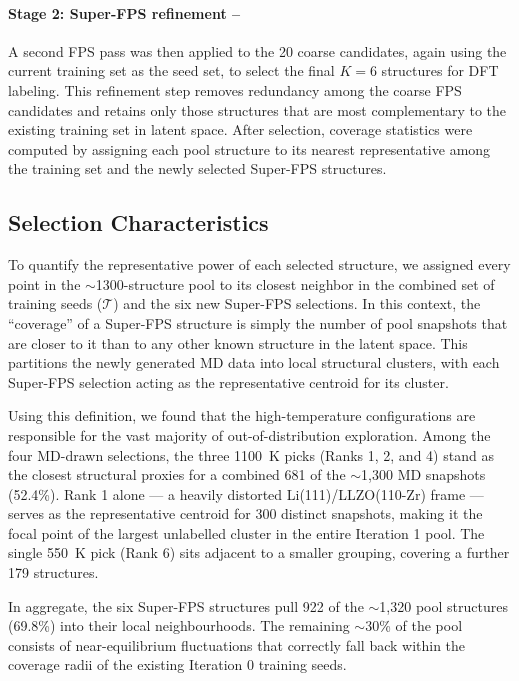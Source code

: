\documentclass[12pt,a4paper,oneside]{book}
\begin{document}
\paragraph{Stage 2: Super-FPS refinement --}
A second FPS pass was then applied to the 20 coarse candidates, again using
the current training set as the seed set, to select the final $K=6$
structures for DFT labeling. This refinement step removes redundancy among
the coarse FPS candidates and retains only those structures that are most
complementary to the existing training set in latent space. After selection,
coverage statistics were computed by assigning each pool structure to its
nearest representative among the training set and the newly selected
Super-FPS structures.
\subsection{Selection Characteristics}

To quantify the representative power of each selected structure, we assigned every point in the $\sim$1300-structure pool to its closest neighbor in the combined set of training seeds ($\mathcal{T}$) and the six new Super-FPS selections. In this context, the ``coverage'' of a Super-FPS structure is simply the number of pool snapshots that are closer to it than to any other known structure in the latent space. This partitions the newly generated MD data into local structural clusters, with each Super-FPS selection acting as the representative centroid for its cluster.

Using this definition, we found that the high-temperature configurations are responsible for the vast majority of out-of-distribution exploration. Among the four MD-drawn selections, the three 1100~K picks (Ranks 1, 2, and 4) stand as the closest structural proxies for a combined 681 of the $\sim$1,300 MD snapshots (52.4\%). Rank 1 alone --- a heavily distorted Li(111)/LLZO(110-Zr) frame --- serves as the representative centroid for 300 distinct snapshots, making it the focal point of the largest unlabelled cluster in the entire Iteration 1 pool. The single 550~K pick (Rank 6) sits adjacent to a smaller grouping, covering a further 179 structures.

In aggregate, the six Super-FPS structures pull 922 of the $\sim$1,320 pool structures (69.8\%) into their local neighbourhoods. The remaining $\sim$30\% of the pool consists of near-equilibrium fluctuations that correctly fall back within the coverage radii of the existing Iteration 0 training seeds.
\end{document}
